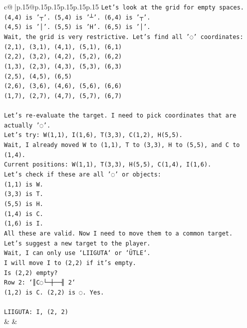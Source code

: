 \documentclass{article}
\begin{document}
{\begin{supertabular}{c@{$\;$}|p{.15\linewidth}@{}p{.15\linewidth}p{.15\linewidth}p{.15\linewidth}p{.15\linewidth}p{.15\linewidth}}
{{{\texttt{Let's look at the grid for empty spaces.} \\
\texttt{(4,4) is '┬'. (5,4) is '┴'. (6,4) is '┬'.} \\
\texttt{(4,5) is '│'. (5,5) is 'H'. (6,5) is '│'.} \\
\texttt{Wait, the grid is very restrictive. Let's find all '◌' coordinates:} \\
\texttt{(2,1), (3,1), (4,1), (5,1), (6,1)} \\
\texttt{(2,2), (3,2), (4,2), (5,2), (6,2)} \\
\texttt{(1,3), (2,3), (4,3), (5,3), (6,3)} \\
\texttt{(2,5), (4,5), (6,5)} \\
\texttt{(2,6), (3,6), (4,6), (5,6), (6,6)} \\
\texttt{(1,7), (2,7), (4,7), (5,7), (6,7)} \\
\\ 
\texttt{Let's re{-}evaluate the target. I need to pick coordinates that are actually '◌'.} \\
\texttt{Let's try: W(1,1), I(1,6), T(3,3), C(1,2), H(5,5).} \\
\texttt{Wait, I already moved W to (1,1), T to (3,3), H to (5,5), and C to (1,4).} \\
\texttt{Current positions: W(1,1), T(3,3), H(5,5), C(1,4), I(1,6).} \\
\texttt{Let's check if these are all '◌' or objects:} \\
\texttt{(1,1) is W.} \\
\texttt{(3,3) is T.} \\
\texttt{(5,5) is H.} \\
\texttt{(1,4) is C.} \\
\texttt{(1,6) is I.} \\
\texttt{All these are valid. Now I need to move them to a common target.} \\
\texttt{Let's suggest a new target to the player.} \\
\texttt{Wait, I can only use `LIIGUTA` or `ÜTLE`.} \\
\texttt{I will move I to (2,2) if it's empty.} \\
\texttt{Is (2,2) empty?} \\
\texttt{Row 2: `║C◌└─┼──╢ 2`} \\
\texttt{(1,2) is C. (2,2) is ◌. Yes.} \\
\\ 
\texttt{LIIGUTA: I, (2, 2)} \\
            }
        }
    }
    & & \\ \\


\end{supertabular}}
\end{document}
